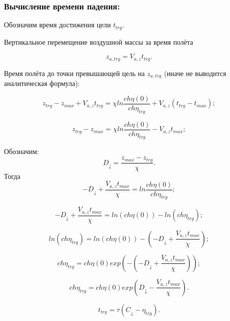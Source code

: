 \subsubsection{Вычисление времени падения:}

Обозначим время достижения цели $t_{trg}$.

Вертикальное перемещение воздушной массы за время полёта

$$z_{a,trg} = V_{a,z}t_{trg}.$$

Время полёта до точки превышающей цель на $z_{a,trg}$ (иначе не выводится аналитическая формула):

$$z_{trg}-z_{max} + V_{a,z}t_{trg} = \chi ln \frac{ch \eta(0)}{ch \eta_{trg}} + V_{a,z}(t_{trg} - t_{max});$$

$$z_{trg}-z_{max} = \chi ln \frac{ch \eta(0)}{ch \eta_{trg}} - V_{a,z}t_{max};$$

Обозначим:
$$\boxed{
	D_\downarrow = \frac{z_{max} - z_{trg}}{\chi}.
}$$
Тогда
$$-D_\downarrow + \frac{V_{a,z}t_{max}}{\chi} =ln \frac{ch \eta(0)}{ch \eta_{trg}};$$

$$-D_\downarrow + \frac{V_{a,z}t_{max}}{\chi} =ln(ch \eta(0)) - ln(ch \eta_{trg});$$

$$ln(ch \eta_{trg}) = ln(ch \eta(0)) - \left (-D_\downarrow + \frac{V_{a,z}t_{max}}{\chi} \right );$$

$$ch \eta_{trg} = ch \eta(0) exp \left ( -\left (-D_\downarrow + \frac{V_{a,z}t_{max}}{\chi} \right ) \right );$$

$$ch \eta_{trg} = ch \eta(0) exp \left ( D_\downarrow - \frac{V_{a,z}t_{max}}{\chi} \right ).$$

$$t_{trg} = \tau \left ( C_\downarrow - \eta_{trg} \right ).$$